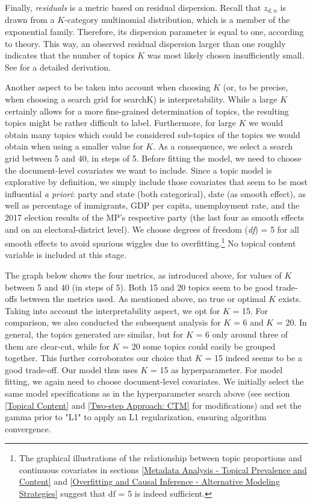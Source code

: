 Finally, \textit{residuals} is a metric based on residual dispersion. Recall that $z_{d,n}$ is drawn from a $K$-category multinomial distribution, which is a member of the exponential family. Therefore, its dispersion parameter is equal to one, according to theory. This way, an observed residual dispersion larger than one roughly indicates that the number of topics $K$ was most likely chosen insufficiently small. See \cite{taddy2012estimation} for a detailed derivation.

Another aspect to be taken into account when choosing $K$ (or, to be precise, when choosing a search grid for searchK) is interpretability. While a large $K$ certainly allows for a more fine-grained determination of topics, the resulting topics might be rather difficult to label. Furthermore, for large $K$ we would obtain many topics which could be considered sub-topics of the topics we would obtain when using a smaller value for $K$. As a consequence, we select a search grid between 5 and 40, in steps of 5. Before fitting the model, we need to choose the document-level covariates we want to include. Since a topic model is explorative by definition, we simply include those covariates that seem to be most influential \textit{a priori}: party and state (both categorical), date (as smooth effect), as well as percentage of immigrants, GDP per capita, unemployment rate, and the 2017 election results of the MP's respective party (the last four as smooth effects and on an electoral-district level). We choose degrees of freedom (\textit{df}) = 5 for all smooth effects to avoid spurious wiggles due to overfitting.\footnote{The graphical illustrations of the relationship between topic proportions and continuous covariates in sections \ref{Metadata Analysis - Topical Prevalence and Content} and \ref{Overfitting and Causal Inference - Alternative Modeling Strategies} suggest that df = 5 is indeed sufficient.} No topical content variable is included at this stage.

The graph below shows the four metrics, as introduced above, for values of $K$ between 5 and 40 (in steps of 5). Both 15 and 20 topics seem to be good trade-offs between the metrics used. As mentioned above, no true or optimal $K$ exists. Taking into account the interpretability aspect, we opt for $K$ = 15. For comparison, we also conducted the subsequent analysis for $K$ = 6 and $K$ = 20. In general, the topics generated are similar, but for $K$ = 6 only around three of them are clear-cut, while for $K$ = 20 some topics could easily be grouped together. This further corroborates our choice that $K$ = 15 indeed seems to be a good trade-off. Our model thus uses $K$ = 15 as hyperparameter. For model fitting, we again need to choose document-level covariates. We initially select the same model specifications as in the hyperparameter search above (see section \ref{Topical Content} and \ref{Two-step Approach: CTM} for modifications) and set the gamma prior to "L1" to apply an L1 regularization, ensuring algorithm convergence.

